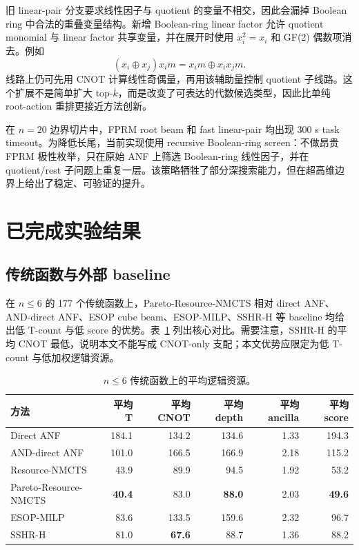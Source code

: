 \documentclass[UTF8,fontset=macnew,11pt]{ctexart}
\newcommand{\method}{Resource-NMCTS}
\newcommand{\pareto}{Pareto-Resource-NMCTS}
\newcommand{\score}{\ensuremath{\mathrm{score}}}
\begin{document}
旧 linear-pair 分支要求线性因子与 quotient 的变量不相交，因此会漏掉 Boolean ring 中合法的重叠变量结构。新增 Boolean-ring linear factor 允许 quotient monomial 与 linear factor 共享变量，并在展开时使用 $x_i^2=x_i$ 和 GF(2) 偶数项消去。例如
\begin{equation}
  (x_i\oplus x_j)x_i m = x_i m \oplus x_i x_j m .
  \label{eq:boolean_ring}
\end{equation}
线路上仍可先用 CNOT 计算线性奇偶量，再用该辅助量控制 quotient 子线路。这个扩展不是简单扩大 top-$k$，而是改变了可表达的代数候选类型，因此比单纯 root-action 重排更接近方法创新。

在 $n=20$ 边界切片中，FPRM root beam 和 fast linear-pair 均出现 300 s task timeout。为降低长尾，当前实现使用 recursive Boolean-ring screen：不做昂贵 FPRM 极性枚举，只在原始 ANF 上筛选 Boolean-ring 线性因子，并在 quotient/rest 子问题上重复一层。该策略牺牲了部分深搜索能力，但在超高维边界上给出了稳定、可验证的提升。

\section{已完成实验结果}

\subsection{传统函数与外部 baseline}

在 $n\leq6$ 的 177 个传统函数上，\pareto{} 相对 direct ANF、AND-direct ANF、ESOP cube beam、ESOP-MILP、SSHR-H 等 baseline 均给出低 T-count 与低 \score{} 的优势。表~\ref{tab:traditional} 列出核心对比。需要注意，SSHR-H 的平均 CNOT 最低，说明本文不能写成 CNOT-only 支配；本文优势应限定为低 T-count 与低加权逻辑资源。

\begin{table}[t]
\centering
\small
\caption{$n\leq6$ 传统函数上的平均逻辑资源。}
\label{tab:traditional}
\begin{tabular}{lrrrrr}
\toprule
方法 & 平均 T & 平均 CNOT & 平均 depth & 平均 ancilla & 平均 score \\
\midrule
Direct ANF & 184.1 & 134.2 & 134.6 & 1.33 & 194.3 \\
AND-direct ANF & 101.0 & 166.5 & 166.9 & 2.18 & 115.2 \\
\method{} & 43.9 & 89.9 & 94.5 & 1.92 & 53.2 \\
\pareto{} & \textbf{40.4} & 83.0 & \textbf{88.0} & 2.03 & \textbf{49.6} \\
ESOP-MILP & 83.6 & 133.5 & 159.6 & 2.32 & 96.7 \\
SSHR-H & 81.0 & \textbf{67.6} & 88.7 & 1.36 & 88.2 \\
\bottomrule
\end{tabular}
\end{table}
\end{document}
